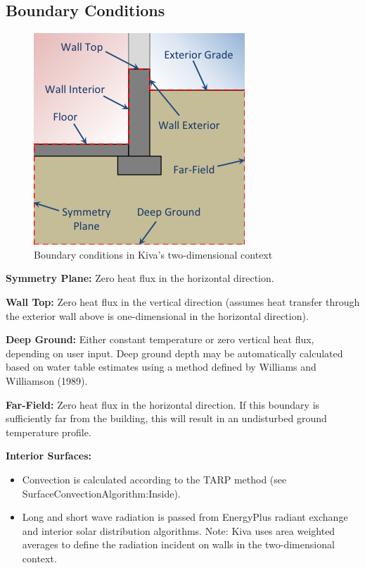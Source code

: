 \subsection{Boundary Conditions}

\begin{figure}
\centering
\includegraphics{media/kiva-2d-boundaries.png}
\caption{Boundary conditions in Kiva's two-dimensional
context\label{fig:bnd}}
\end{figure}

\textbf{Symmetry Plane:} Zero heat flux in the horizontal direction.

\textbf{Wall Top:} Zero heat flux in the vertical direction (assumes
heat transfer through the exterior wall above is one-dimensional in the
horizontal direction).

\textbf{Deep Ground:} Either constant temperature or zero vertical heat
flux, depending on user input. Deep ground depth may be automatically
calculated based on water table estimates using a method defined by
Williams and Williamson (1989).

\textbf{Far-Field:} Zero heat flux in the horizontal direction. If this
boundary is sufficiently far from the building, this will result in an
undisturbed ground temperature profile.

\textbf{Interior Surfaces:}

\begin{itemize}
\tightlist
\item
  Convection is calculated according to the TARP method (see
  SurfaceConvectionAlgorithm:Inside).
\item
  Long and short wave radiation is passed from EnergyPlus radiant
  exchange and interior solar distribution algorithms. Note: Kiva uses
  area weighted averages to define the radiation incident on walls in
  the two-dimensional context.
\end{itemize}

